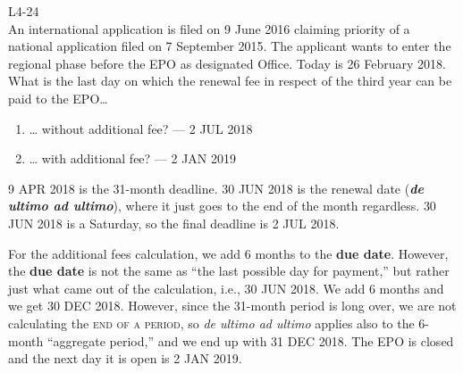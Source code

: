 \documentclass{report}
\begin{document}
\begin{enumerate}[label=\textbf{Answer \arabic*}]
\begin{enumerate}[label=\textbf{Answer \arabic*}]
    \vspace{1em}
    L4-24 \\
    An international application is filed on 9 June 2016 claiming priority of a national application filed on 7 September 2015. The applicant wants to enter the regional phase before the EPO as designated Office. Today is 26 February 2018. \\
    What is the last day on which the renewal fee in respect of the third year can be paid to the EPO…
    \begin{enumerate}[label=(\alph*), resume]
        \item … without additional fee? --- \textsc{2 JUL 2018}
        \item … with additional fee? --- \textsc{2 JAN 2019}
    \end{enumerate}

     \textsc{9 APR 2018} is the 31-month deadline. 
    \textsc{30 JUN 2018} is the renewal date (\textit{\textbf{de ultimo ad ultimo}}), where it just goes to the end of the month regardless. \textsc{30 JUN 2018} is a Saturday, so the final deadline is \textsc{2 JUL 2018}.
    
    For the additional fees calculation, we add 6 months to the \textbf{due date}. However, the \textbf{due date} is not the same as ``the last possible day for payment,'' but rather just what came out of the calculation, i.e., \textsc{30 JUN 2018}. We add 6 months and we get 30 DEC 2018. However, since the 31-month period is long over, we are not calculating the \textsc{end of a period}, so \textit{de ultimo ad ultimo} applies also to the 6-month ``aggregate period,'' and we end up with 31 DEC 2018. The EPO is closed and the next day it is open is \textsc{2 JAN 2019}.
    
    

\end{enumerate}
\end{enumerate}
\end{document}
